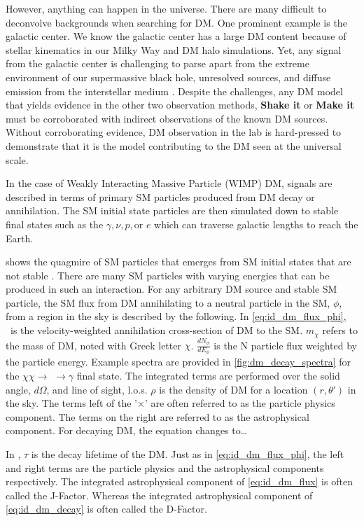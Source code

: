 However, anything can happen in the universe.
There are many difficult to deconvolve backgrounds when searching for DM.
One prominent example is the galactic center.
We know the galactic center has a large DM content because of stellar kinematics in our Milky Way and DM halo simulations.
Yet, any signal from the galactic center is challenging to parse apart from the extreme environment of our supermassive black hole, unresolved sources, and diffuse emission from the interstellar medium \cite{Tracy:les_houches}.
Despite the challenges, any DM model that yields evidence in the other two observation methods, \textbf{Shake it} or \textbf{Make it} must be corroborated with indirect observations of the known DM sources.
Without corroborating evidence, DM observation in the lab is hard-pressed to demonstrate that it is the model contributing to the DM seen at the universal scale.

In the case of Weakly Interacting Massive Particle (WIMP) DM, signals are described in terms of primary SM particles produced from DM decay or annihilation.
The SM initial state particles are then simulated down to stable final states such as the $\gamma, \nu, p, \text{or } e$ which can traverse galactic lengths to reach the Earth.

 shows the quagmire of SM particles that emerges from SM initial states that are not stable \cite{2021ICRC:glory_duck}.
There are many SM particles with varying energies that can be produced in such an interaction.
For any arbitrary DM source and stable SM particle, the SM flux from DM annihilating to a neutral particle in the SM, $\phi$, from a region in the sky is described by the following.
\iddmannilationPhi
In \cref{eq:id_dm_flux_phi}, \sv~is the velocity-weighted annihilation cross-section of DM to the SM.
$m_\chi$ refers to the mass of DM, noted with Greek letter $\chi$.
$\frac{dN_{\phi}}{dE_\phi}$ is the N particle flux weighted by the particle energy.
Example spectra are provided in \cref{fig:dm_decay_spectra} for the $\chi\chi \rightarrow$  $\rightarrow \gamma$ final state.
The integrated terms are performed over the solid angle, $d\Omega$, and line of sight, l.o.s.
$\rho$ is the density of DM for a location $(r, \theta')$ in the sky.
The terms left of the '$\times$' are often referred to as the particle physics component.
The terms on the right are referred to as the astrophysical component.
For decaying DM, the equation changes to\dots
\iddmdecay

In , $\tau$ is the decay lifetime of the DM.
Just as in \cref{eq:id_dm_flux_phi}, the left and right terms are the particle physics and the astrophysical components respectively.
The integrated astrophysical component of \cref{eq:id_dm_flux} is often called the J-Factor.
Whereas the integrated astrophysical component of \cref{eq:id_dm_decay} is often called the D-Factor.

